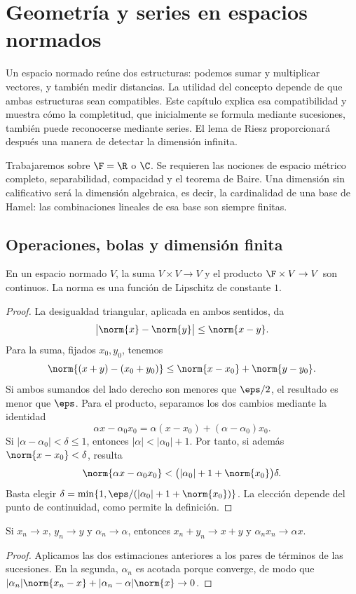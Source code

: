 \chapter{Geometría y series en espacios normados}\label{chap:19}

Un espacio normado reúne dos estructuras: podemos sumar y multiplicar vectores, y también medir distancias. La utilidad del concepto depende de que ambas estructuras sean compatibles. Este capítulo explica esa compatibilidad y muestra cómo la completitud, que inicialmente se formula mediante sucesiones, también puede reconocerse mediante series. El lema de Riesz proporcionará después una manera de detectar la dimensión infinita.

Trabajaremos sobre $\F=\R$ o $\C$. Se requieren las nociones de espacio métrico completo, separabilidad, compacidad y el teorema de Baire. Una dimensión sin calificativo será la dimensión algebraica, es decir, la cardinalidad de una base de Hamel: las combinaciones lineales de esa base son siempre finitas.

\section{Operaciones, bolas y dimensión finita}

\begin{proposicion}\label{ch19:operaciones}
En un espacio normado $V$, la suma $V\times V\to V$ y el producto $\F\times V\to V$ son continuos. La norma es una función de Lipschitz de constante $1$.
\end{proposicion}
\begin{proof}
La desigualdad triangular, aplicada en ambos sentidos, da
\[
 \big|\norm{x}-\norm{y}\big|\leq\norm{x-y}.
\]
Para la suma, fijados $x_0,y_0$, tenemos
\[
 \norm{(x+y)-(x_0+y_0)}\leq\norm{x-x_0}+\norm{y-y_0}.
\]
Si ambos sumandos del lado derecho son menores que $\eps/2$, el resultado es menor que $\eps$. Para el producto, separamos los dos cambios mediante la identidad
\[
 \alpha x-\alpha_0x_0=\alpha(x-x_0)+(\alpha-\alpha_0)x_0.
\]
Si $|\alpha-\alpha_0|<\delta\leq1$, entonces $|\alpha|<|\alpha_0|+1$. Por tanto, si además $\norm{x-x_0}<\delta$, resulta
\[
 \norm{\alpha x-\alpha_0x_0}
 <\bigl(|\alpha_0|+1+\norm{x_0}\bigr)\delta.
\]
Basta elegir $\delta=\min\{1,\eps/(|\alpha_0|+1+\norm{x_0})\}$. La elección depende del punto de continuidad, como permite la definición.
\end{proof}

\begin{corolario}\label{ch19:limites}
Si $x_n\to x$, $y_n\to y$ y $\alpha_n\to\alpha$, entonces $x_n+y_n\to x+y$ y $\alpha_nx_n\to\alpha x$.
\end{corolario}
\begin{proof}
Aplicamos las dos estimaciones anteriores a los pares de términos de las sucesiones. En la segunda, $\alpha_n$ es acotada porque converge, de modo que $|\alpha_n|\norm{x_n-x}+|\alpha_n-\alpha|\norm{x}\to0$.
\end{proof}

